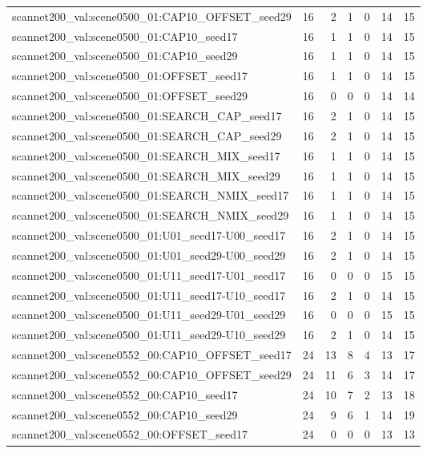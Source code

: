 \begin{table}[t]
\begin{tabular}{lrrrrrr}
scannet200\_val:scene0500\_01:CAP10\_OFFSET\_seed29 & 16 & 2 & 1 & 0 & 14 & 15 \\
scannet200\_val:scene0500\_01:CAP10\_seed17 & 16 & 1 & 1 & 0 & 14 & 15 \\
scannet200\_val:scene0500\_01:CAP10\_seed29 & 16 & 1 & 1 & 0 & 14 & 15 \\
scannet200\_val:scene0500\_01:OFFSET\_seed17 & 16 & 1 & 1 & 0 & 14 & 15 \\
scannet200\_val:scene0500\_01:OFFSET\_seed29 & 16 & 0 & 0 & 0 & 14 & 14 \\
scannet200\_val:scene0500\_01:SEARCH\_CAP\_seed17 & 16 & 2 & 1 & 0 & 14 & 15 \\
scannet200\_val:scene0500\_01:SEARCH\_CAP\_seed29 & 16 & 2 & 1 & 0 & 14 & 15 \\
scannet200\_val:scene0500\_01:SEARCH\_MIX\_seed17 & 16 & 1 & 1 & 0 & 14 & 15 \\
scannet200\_val:scene0500\_01:SEARCH\_MIX\_seed29 & 16 & 1 & 1 & 0 & 14 & 15 \\
scannet200\_val:scene0500\_01:SEARCH\_NMIX\_seed17 & 16 & 1 & 1 & 0 & 14 & 15 \\
scannet200\_val:scene0500\_01:SEARCH\_NMIX\_seed29 & 16 & 1 & 1 & 0 & 14 & 15 \\
scannet200\_val:scene0500\_01:U01\_seed17-U00\_seed17 & 16 & 2 & 1 & 0 & 14 & 15 \\
scannet200\_val:scene0500\_01:U01\_seed29-U00\_seed29 & 16 & 2 & 1 & 0 & 14 & 15 \\
scannet200\_val:scene0500\_01:U11\_seed17-U01\_seed17 & 16 & 0 & 0 & 0 & 15 & 15 \\
scannet200\_val:scene0500\_01:U11\_seed17-U10\_seed17 & 16 & 2 & 1 & 0 & 14 & 15 \\
scannet200\_val:scene0500\_01:U11\_seed29-U01\_seed29 & 16 & 0 & 0 & 0 & 15 & 15 \\
scannet200\_val:scene0500\_01:U11\_seed29-U10\_seed29 & 16 & 2 & 1 & 0 & 14 & 15 \\
scannet200\_val:scene0552\_00:CAP10\_OFFSET\_seed17 & 24 & 13 & 8 & 4 & 13 & 17 \\
scannet200\_val:scene0552\_00:CAP10\_OFFSET\_seed29 & 24 & 11 & 6 & 3 & 14 & 17 \\
scannet200\_val:scene0552\_00:CAP10\_seed17 & 24 & 10 & 7 & 2 & 13 & 18 \\
scannet200\_val:scene0552\_00:CAP10\_seed29 & 24 & 9 & 6 & 1 & 14 & 19 \\
scannet200\_val:scene0552\_00:OFFSET\_seed17 & 24 & 0 & 0 & 0 & 13 & 13 \\

\end{tabular}
\end{table}
